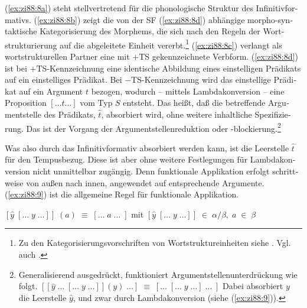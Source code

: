 \documentclass[output=paper,colorlinks,citecolor=brown, booklanguage=german]{langscibook}
\begin{document}
\begin{otherlanguage}{german}
\noindent (\ref{ex:zi88:8a}) steht stellvertretend für die phonologische Struktur des Infinitivformativs. (\ref{ex:zi88:8b}) zeigt die von der SF (\ref{ex:zi88:8d}) abhängige morpho-syntaktische Kategorisierung des Morphems, die sich nach den Regeln der Wortstrukturierung auf die ab\-ge\-lei\-te\-te Einheit vererbt.\footnote{Zu den Kategorisierungsvorschriften von Wortstruktureinheiten siehe \citet{Lieber1980,Lieber1981,Lieber1983}. Vgl. auch \citet{Zimmermann1987c}.} (\ref{ex:zi88:8c}) verlangt als wortstrukturellen Partner eine mit $+$TS gekennzeichnete Verbform. (\ref{ex:zi88:8d}) ist bei $+$TS-Kennzeichnung eine iden\-ti\-sche Abbildung eines einstelligen Prädikats auf ein einstelliges Prädikat. Bei $-$TS-Kennzeichnung wird das einstellige Prädikat auf ein Argument $t$ bezogen, wodurch -- mittels Lambdakonversion -- eine Proposition $[\dots t \dots]$ vom Typ $S$ entsteht. Das heißt, daß die betreffende Argumentstelle des Prädikats, $\hat{t}$, absorbiert wird, ohne weitere inhaltliche Spezifizierung. Das ist der Vorgang der Argumentstellenreduktion oder -blockierung.\footnote{Generalisierend ausgedrückt, funktioniert Argumentstellenunterdrückung wie folgt.
    \ea $[[\hat{y} \; \dots \; [\dots \; y \; \dots]](y) \; \dots] \; \equiv \; [\dots \; [\dots \; y \; \dots] \; \dots \; ]$\z 
    \noindent Dabei absorbiert $y$ die Leerstelle $\hat{y}$, und zwar durch Lambdakonversion (siehe (\ref{ex:zi88:9})).
    }

Was also durch das Infinitivformativ absorbiert werden kann, ist die Leerstelle $\hat{t}$ für den Tempusbezug. Diese ist aber ohne weitere Festlegungen für Lambdakonversion nicht unmittelbar zugängig. Denn funktionale Applikation erfolgt schritt\-wei\-se von außen nach innen, angewendet auf entsprechende Argumente. (\ref{ex:zi88:9}) ist die allgemeine Regel für funktionale Applikation.

\ea\label{ex:zi88:9} $[\hat{y} \; [\dots \; y \; \dots]] \; (a) \; \equiv \; [\dots \; a \; \dots \; ]$ \newline mit \; $[\hat{y} \; [\dots \; y \; \dots]] \; \in \; \alpha/\beta, \; a \; \in \; \beta$
\z 


\end{otherlanguage}
\end{document}

